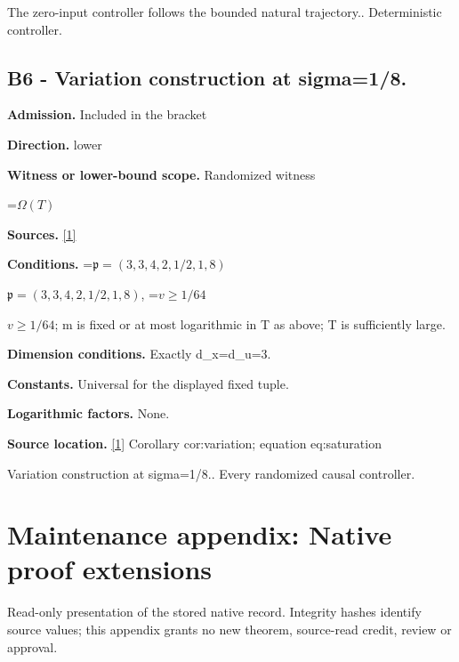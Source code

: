 \documentclass[10pt,a4paper]{article}
\newcommand{\AtlasMath}[1]{\par\begingroup\centering\setbox0=\hbox{$\displaystyle #1$}\ifdim\wd0>1.4\linewidth\typeout{ATLAS WIDE FORMULA: \the\wd0}\fi\ifdim\wd0>\linewidth\resizebox{\linewidth}{!}{\box0}\else\box0\fi\par\endgroup}
\newcommand{\AtlasInlineMath}[1]{\begingroup\setbox0=\hbox{$#1$}\ifdim\wd0>.4\linewidth\endgroup\AtlasMath{#1}\else\endgroup$#1$\fi}
\begin{document}
The zero-input controller follows the bounded natural trajectory.. Deterministic controller.



\subsection{B6 - Variation construction at sigma=1/8.}


\textbf{Admission.} Included in the bracket



\textbf{Direction.} lower



\textbf{Witness or lower-bound scope.} Randomized witness



\AtlasMath{\Omega(T)}


\textbf{Sources.} \href{https://github.com/WU-Wendao/Colombo/blob/main/colombo_sensorium/Complexity_altas/data/sources/colombo/Q6/manuscript.pdf}{[1]}



\textbf{Conditions.} \AtlasInlineMath{\mathfrak p=(3,3,4,2,1/2,1,8)}, \AtlasInlineMath{v\ge1/64}; m is fixed or at most logarithmic in T as above; T is sufficiently large.



\textbf{Dimension conditions.} Exactly d\_x=d\_u=3.



\textbf{Constants.} Universal for the displayed fixed tuple.



\textbf{Logarithmic factors.} None.



\textbf{Source location.} \href{https://github.com/WU-Wendao/Colombo/blob/main/colombo_sensorium/Complexity_altas/data/sources/colombo/Q6/manuscript.pdf}{[1]} Corollary cor:variation; equation eq:saturation



Variation construction at sigma=1/8.. Every randomized causal controller.



\section{Maintenance appendix: Native proof extensions}


Read-only presentation of the stored native record. Integrity hashes identify source values; this appendix grants no new theorem, source-read credit, review or approval.
\end{document}
